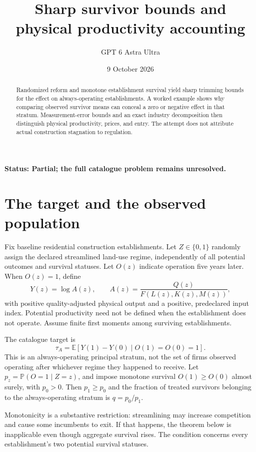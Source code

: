 \documentclass[11pt,a4paper]{article}
\title{Sharp survivor bounds and physical productivity accounting}
\author{GPT 6 Astra Ultra}
\date{9 October 2026}
\newcommand{\E}{\mathbb E}
\newcommand{\Prob}{\mathbb P}
\begin{document}
\maketitle
\textbf{Status: Partial; the full catalogue problem remains unresolved.}

\begin{abstract}
Randomized reform and monotone establishment survival yield sharp trimming bounds for the effect on always-operating establishments. A worked example shows why comparing observed survivor means can conceal a zero or negative effect in that stratum. Measurement-error bounds and an exact industry decomposition then distinguish physical productivity, prices, and entry. The attempt does not attribute actual construction stagnation to regulation.
\end{abstract}
\section{The target and the observed population}
Fix baseline residential construction establishments. Let $Z\in\{0,1\}$ randomly assign the declared streamlined land-use regime, independently of all potential outcomes and survival statuses. Let $O(z)$ indicate operation five years later. When $O(z)=1$, define
\[
 Y(z)=\log A(z),\qquad
 A(z)=\frac{Q(z)}{F(L(z),K(z),M(z))},
\]
with positive quality-adjusted physical output and a positive, predeclared input index. Potential productivity need not be defined when the establishment does not operate. Assume finite first moments among surviving establishments.

The catalogue target is
\[
 \tau_A=\E[Y(1)-Y(0)\mid O(1)=O(0)=1].
 \tag{1}
\]
This is an always-operating principal stratum, not the set of firms observed operating after whichever regime they happened to receive. Let
$p_z=\Prob(O=1\mid Z=z)$, and impose monotone survival
$O(1)\ge O(0)$ almost surely, with $p_0>0$. Then $p_1\ge p_0$ and the fraction of treated survivors belonging to the always-operating stratum is $q=p_0/p_1$.

Monotonicity is a substantive restriction: streamlining may increase competition and cause some incumbents to exit. If that happens, the theorem below is inapplicable even though aggregate survival rises. The condition concerns every establishment's two potential survival statuses.
\end{document}
